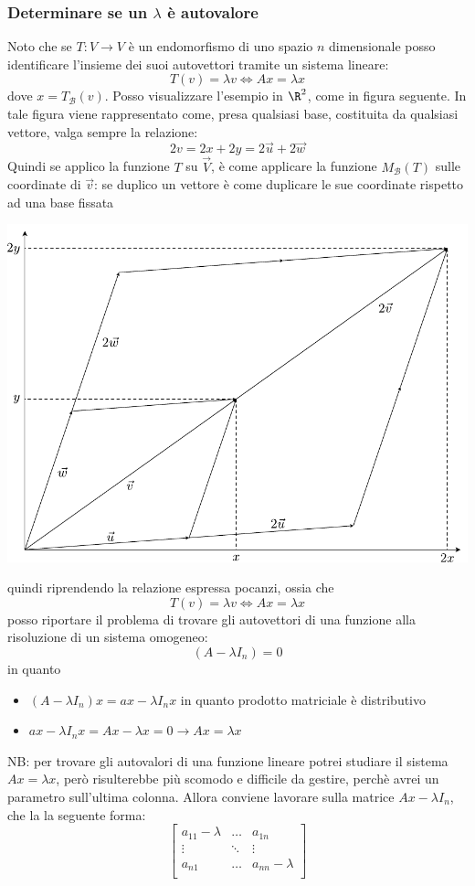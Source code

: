 \documentclass[12pt,a4paper,oneside]{article}
\begin{document}
\subsubsection*{Determinare se un $ \lambda  $ è autovalore}
Noto che se $ T : V \to V $ è un endomorfismo di uno spazio $ n $ dimensionale posso identificare l'insieme dei suoi autovettori tramite un sistema lineare:
\[
	T\left( v \right) = \lambda  v \Leftrightarrow A x = \lambda x
\]
dove $ x= T_{ \mathcal{B}}\left( v \right)  $. Posso visualizzare l'esempio in $ \R^{2} $, come in figura seguente. In tale figura viene rappresentato come, presa qualsiasi base, costituita da qualsiasi vettore, valga sempre la relazione:
\[
	2v= 2 x + 2y = 2 \vec{u} + 2 \vec{w}
\]
Quindi se applico la funzione $ T $ su $ \vec{V}  $, è come applicare la funzione $M_{ \mathcal{B}  }\left( T \right) $ sulle coordinate di $ \vec{v}  $: se duplico un vettore è come duplicare le sue coordinate rispetto ad una base fissata
\begin{center}
	\includegraphics{Images/DetAutovalore.pdf}
\end{center}
quindi riprendendo la relazione espressa pocanzi, ossia che
\[
	T\left( v \right)  = \lambda v \Leftrightarrow Ax = \lambda x
\]
posso riportare il problema di trovare gli autovettori di una funzione alla risoluzione di un sistema omogeneo:
\[
	\left( A- \lambda  I_n \right) =0
\]
in quanto
\begin{itemize}
	\item $ \left( A- \lambda  I_n \right) x = ax - \lambda I_nx $ in quanto prodotto matriciale è distributivo
	\item $  ax - \lambda I_nx = Ax - \lambda x =0 \rightarrow Ax = \lambda  x$
\end{itemize}
\vskip3mm
NB: per trovare gli autovalori di una funzione lineare potrei studiare il sistema $ Ax = \lambda  x $, però risulterebbe più scomodo e difficile da gestire, perchè avrei un parametro sull'ultima colonna. Allora conviene lavorare sulla matrice $ Ax-\lambda I_n $, che la la seguente forma:
\[
	\begin{bmatrix}
		a_{11}-\lambda & \ldots & a_{1n}         \\
		\vdots         & \ddots & \vdots         \\
		a_{n1}         & \ldots & a_{nn}-\lambda \\
	\end{bmatrix}
\]
\end{document}
